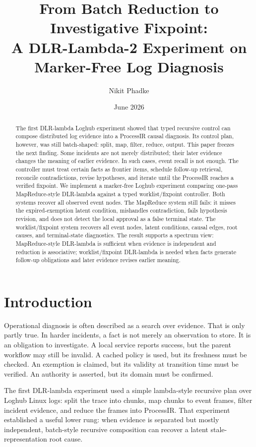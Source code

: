 \documentclass[11pt]{article}
\title{\textbf{From Batch Reduction to Investigative Fixpoint:}\\
A DLR-Lambda-2 Experiment on Marker-Free Log Diagnosis}
\author{Nikit Phadke}
\date{June 2026}
\begin{document}
\maketitle

\begin{abstract}
The first DLR-lambda Loghub experiment showed that typed recursive control can
compose distributed log evidence into a ProcessIR causal diagnosis. Its control
plan, however, was still batch-shaped: split, map, filter, reduce, output. This
paper freezes the next finding. Some incidents are not merely distributed; their
later evidence changes the meaning of earlier evidence. In such cases, event
recall is not enough. The controller must treat certain facts as frontier items,
schedule follow-up retrieval, reconcile contradictions, revise hypotheses, and
iterate until the ProcessIR reaches a verified fixpoint. We implement a
marker-free Loghub experiment comparing one-pass MapReduce-style DLR-lambda
against a typed worklist/fixpoint controller. Both systems recover all observed
event nodes. The MapReduce system still fails: it misses the expired-exemption
latent condition, mishandles contradiction, fails hypothesis revision, and does
not detect the local approval as a false terminal state. The worklist/fixpoint
system recovers all event nodes, latent conditions, causal edges, root causes,
and terminal-state diagnostics. The result supports a spectrum view:
MapReduce-style DLR-lambda is sufficient when evidence is independent and
reduction is associative; worklist/fixpoint DLR-lambda is needed when facts
generate follow-up obligations and later evidence revises earlier meaning.
\end{abstract}

\section{Introduction}

Operational diagnosis is often described as a search over evidence. That is only
partly true. In harder incidents, a fact is not merely an observation to store.
It is an obligation to investigate. A local service reports success, but the
parent workflow may still be invalid. A cached policy is used, but its freshness
must be checked. An exemption is claimed, but its validity at transition time
must be verified. An authority is asserted, but its domain must be confirmed.

The first DLR-lambda experiment \cite{dlr_lambda_1} used a simple
lambda-style recursive plan over Loghub Linux logs: split the trace into
chunks, map chunks to event frames, filter incident evidence, and reduce the
frames into ProcessIR. That experiment established a useful lower rung: when
evidence is separated but mostly independent, batch-style recursive composition
can recover a latent stale-representation root cause.
\end{document}
